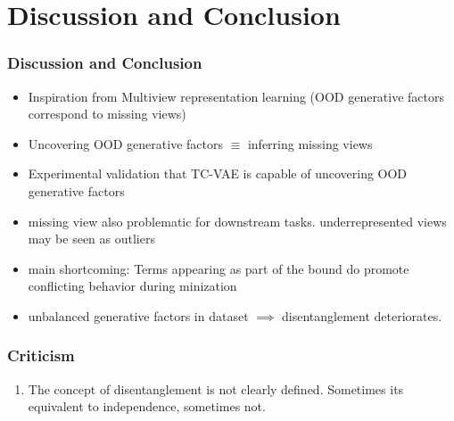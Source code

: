 \documentclass{beamer}
\theoremstyle{definition}
\begin{document}
  \section{Discussion and Conclusion}
    \begin{frame}
      \frametitle{Discussion and Conclusion}
      \begin{itemize}
        \item Inspiration from Multiview representation learning (OOD generative factors correspond to missing views)
        \item Uncovering OOD generative factors $\equiv$ inferring missing views
        \item Experimental validation that TC-VAE is capable of uncovering OOD generative factors
        \item missing view also problematic for downstream tasks. underrepresented views may be seen as outliers
        \item main shortcoming: Terms appearing as part of the bound do promote conflicting behavior during minization
        \item unbalanced generative factors in dataset $\implies$ disentanglement deteriorates.
      \end{itemize}
    \end{frame}


    \begin{frame}
      \frametitle{Criticism}
      \begin{enumerate}
              \item The concept of disentanglement is not clearly defined. Sometimes its equivalent to independence, sometimes not.
      \end{enumerate}
    \end{frame}
\end{document}
